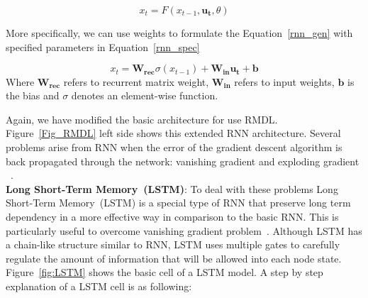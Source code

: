 \documentclass[sigconf, final]{acmart}
\begin{document}
\begin{equation}
\label{rnn_gen}
x_{t}=F(x_{t-1},\boldsymbol{u_t},\theta)
\end{equation}

More specifically, we can use weights to formulate the Equation~\ref{rnn_gen} with  specified parameters in Equation~\ref{rnn_spec}


\begin{equation}\label{rnn_spec}
x_{t}=\mathbf{W_{rec}}\sigma(x_{t-1})+\mathbf{W_{in}}\mathbf{u_t}+\mathbf{b}
\end{equation}
Where $\mathbf{W_{rec}}$ refers to recurrent matrix weight, $\mathbf{W_{in}}$ refers to input weights, $\mathbf{b}$ is the bias and $\sigma$ denotes an element-wise function. 

Again, we have modified the basic architecture for use RMDL. Figure~\ref{Fig_RMDL} left side shows this extended RNN architecture. Several problems arise from RNN when the error of the gradient descent algorithm is back propagated through the network: vanishing gradient and exploding gradient ~\cite{bengio1994learning}. \\
\textbf{Long Short-Term Memory~(LSTM)}: To deal with these problems Long Short-Term Memory~(LSTM) is a special type of RNN that preserve long term dependency in a more effective way in comparison to the basic RNN. This is particularly useful to overcome vanishing gradient problem~\cite{pascanu2013difficulty}. Although LSTM has a chain-like structure similar to RNN,
LSTM uses multiple gates to carefully regulate the amount of information that will be allowed into each node state. Figure~\ref{fig:LSTM} shows the basic cell of a LSTM model. A step by step explanation of a LSTM cell is as following:
\end{document}
